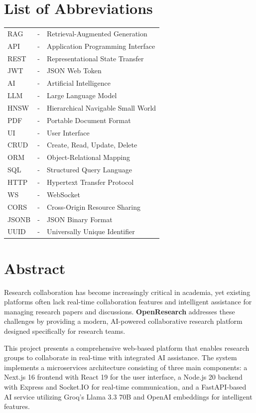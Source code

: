 \documentclass[12pt]{report}
\begin{document}
\chapter*{List of Abbreviations\hfill} 
\begin{tabular}{lll}
RAG & - & Retrieval-Augmented Generation \\
API & - & Application Programming Interface \\
REST & - & Representational State Transfer \\
JWT & - & JSON Web Token \\
AI & - & Artificial Intelligence \\
LLM & - & Large Language Model \\
HNSW & - & Hierarchical Navigable Small World \\
PDF & - & Portable Document Format \\
UI & - & User Interface \\
CRUD & - & Create, Read, Update, Delete \\
ORM & - & Object-Relational Mapping \\
SQL & - & Structured Query Language \\
HTTP & - & Hypertext Transfer Protocol \\
WS & - & WebSocket \\
CORS & - & Cross-Origin Resource Sharing \\
JSONB & - & JSON Binary Format \\
UUID & - & Universally Unique Identifier \\
\end{tabular}
\newpage

\chapter*{Abstract\hfill} 

Research collaboration has become increasingly critical in academia, yet existing platforms often lack real-time collaboration features and intelligent assistance for managing research papers and discussions. \textbf{OpenResearch} addresses these challenges by providing a modern, AI-powered collaborative research platform designed specifically for research teams.

This project presents a comprehensive web-based platform that enables research groups to collaborate in real-time with integrated AI assistance. The system implements a microservices architecture consisting of three main components: a Next.js 16 frontend with React 19 for the user interface, a Node.js 20 backend with Express and Socket.IO for real-time communication, and a FastAPI-based AI service utilizing Groq's Llama 3.3 70B and OpenAI embeddings for intelligent features.
\end{document}
